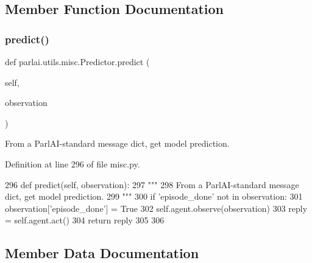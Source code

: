 \subsection{Member Function Documentation}
\mbox{\label{classparlai_1_1utils_1_1misc_1_1Predictor_a7ff8a927bca43d09d3113dad20cb2a11}} 
\subsubsection{\texorpdfstring{predict()}{predict()}}
{\footnotesize\ttfamily def parlai.\+utils.\+misc.\+Predictor.\+predict (\begin{DoxyParamCaption}\item[{}]{self,  }\item[{}]{observation }\end{DoxyParamCaption})}

\begin{DoxyVerb}From a ParlAI-standard message dict, get model prediction.
\end{DoxyVerb}
 

Definition at line 296 of file misc.\+py.


\begin{DoxyCode}
296     \textcolor{keyword}{def }predict(self, observation):
297         \textcolor{stringliteral}{"""}
298 \textcolor{stringliteral}{        From a ParlAI-standard message dict, get model prediction.}
299 \textcolor{stringliteral}{        """}
300         \textcolor{keywordflow}{if} \textcolor{stringliteral}{'episode\_done'} \textcolor{keywordflow}{not} \textcolor{keywordflow}{in} observation:
301             observation[\textcolor{stringliteral}{'episode\_done'}] = \textcolor{keyword}{True}
302         self.agent.observe(observation)
303         reply = self.agent.act()
304         \textcolor{keywordflow}{return} reply
305 
306 
\end{DoxyCode}


\subsection{Member Data Documentation}
\mbox{\label{classparlai_1_1utils_1_1misc_1_1Predictor_a0ea35fd562c6edaa6affd03006f1bd08}} 
